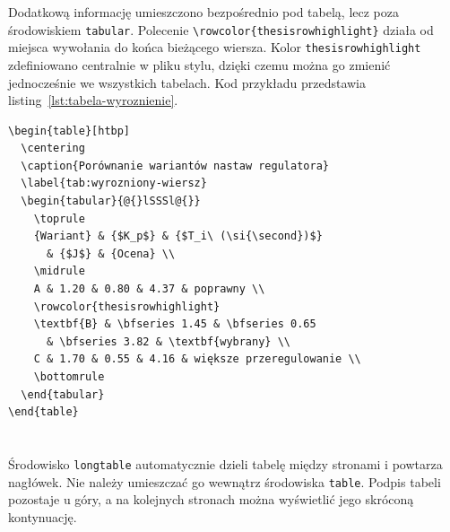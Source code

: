 Dodatkową informację umieszczono bezpośrednio pod tabelą, lecz poza środowiskiem
\texttt{tabular}. Polecenie \verb|\rowcolor{thesisrowhighlight}| działa od miejsca
wywołania do końca bieżącego wiersza. Kolor \texttt{thesisrowhighlight} zdefiniowano
centralnie w pliku stylu, dzięki czemu można go zmienić jednocześnie we wszystkich
tabelach. Kod przykładu przedstawia listing~\ref{lst:tabela-wyroznienie}.

\begin{lstlisting}[style=thesis,caption={Kod tabeli z wyróżnionym wierszem},label={lst:tabela-wyroznienie}]
\begin{table}[htbp]
  \centering
  \caption{Porównanie wariantów nastaw regulatora}
  \label{tab:wyrozniony-wiersz}
  \begin{tabular}{@{}lSSSl@{}}
    \toprule
    {Wariant} & {$K_p$} & {$T_i\ (\si{\second})$}
      & {$J$} & {Ocena} \\
    \midrule
    A & 1.20 & 0.80 & 4.37 & poprawny \\
    \rowcolor{thesisrowhighlight}
    \textbf{B} & \bfseries 1.45 & \bfseries 0.65
      & \bfseries 3.82 & \textbf{wybrany} \\
    C & 1.70 & 0.55 & 4.16 & większe przeregulowanie \\
    \bottomrule
  \end{tabular}
\end{table}
\end{lstlisting}

\section{}

Środowisko \texttt{longtable} automatycznie dzieli tabelę między stronami i powtarza
nagłówek. Nie należy umieszczać go wewnątrz środowiska \texttt{table}. Podpis tabeli
pozostaje u góry, a na kolejnych stronach można wyświetlić jego skróconą kontynuację.

